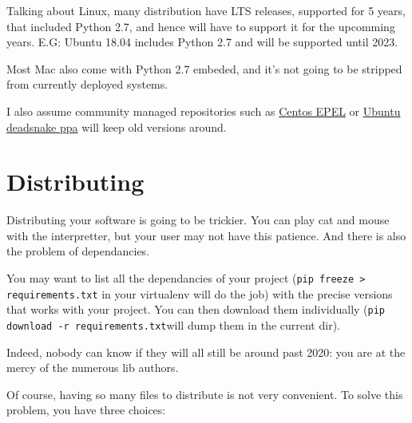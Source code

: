 Talking about Linux, many distribution have LTS releases, supported for 5 years, that included Python 2.7, and hence will have to support it for the upcomming years. E.G: Ubuntu 18.04 includes Python 2.7 and will be supported until 2023.

Most Mac also come with Python 2.7 embeded, and it's not going to be stripped from currently deployed systems.

I also assume community managed repositories such as \href{https://www.linuxtricks.fr/wiki/centos-rhel-ajouter-des-depots-supplementaires}{Centos EPEL} or \href{https://launchpad.net/~deadsnakes/+archive/ubuntu/ppa}{Ubuntu deadsnake ppa} will keep old versions around.

\section{Distributing}

Distributing your software is going to be trickier. You can play cat and mouse with the interpretter, but your user may not have this patience. And there is also the problem of dependancies.

You may want to list all the dependancies of your project (\lstinline{pip freeze > requirements.txt} in your virtualenv will do the job) with the precise versions that works with your project. You can then download them individually (\lstinline{pip download -r requirements.txt}will dump them in the current dir).

Indeed, nobody can know if they will all still be around past 2020: you are at the mercy of the numerous lib authors.

Of course, having so many files to distribute is not very convenient. To solve this problem, you have three choices:

